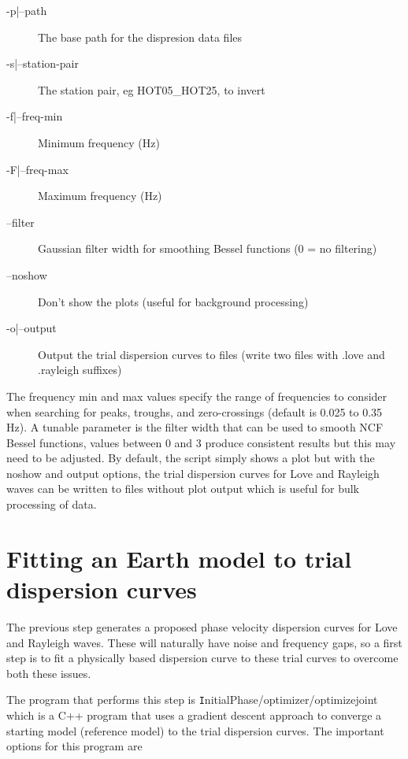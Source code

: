 \documentclass{article}
\begin{document}
\begin{description}
\item[-p|--path] The base path for the dispresion data files
\item[-s|--station-pair] The station pair, eg HOT05\_HOT25, to invert
\item[-f|--freq-min] Minimum frequency (Hz)
\item[-F|--freq-max] Maximum frequency (Hz)
\item[--filter] Gaussian filter width for smoothing Bessel functions (0 = no filtering)
\item[--noshow] Don't show the plots (useful for background processing)
\item[-o|--output] Output the trial dispersion curves to files (write two files with .love and .rayleigh suffixes)
\end{description}

The frequency min and max values specify the range of frequencies to
consider when searching for peaks, troughs, and zero-crossings
(default is 0.025 to 0.35 Hz). A tunable parameter is the filter width
that can be used to smooth NCF Bessel functions, values between 0 and
3 produce consistent results but this may need to be adjusted. By
default, the script simply shows a plot but with the noshow and output
options, the trial dispersion curves for Love and Rayleigh waves can
be written to files without plot output which is useful for bulk
processing of data.

\section{Fitting an Earth model to trial dispersion curves}

The previous step generates a proposed phase velocity dispersion curves for Love and Rayleigh
waves. These will naturally have noise and frequency gaps, so a first step is to fit a physically
based dispersion curve to these trial curves to overcome both these issues.

The program that performs this step is {\texttt InitialPhase/optimizer/optimizejoint} which is
a C++ program that uses a gradient descent approach to converge a starting model (reference model)
to the trial dispersion curves. The important options for this program are
\end{document}
